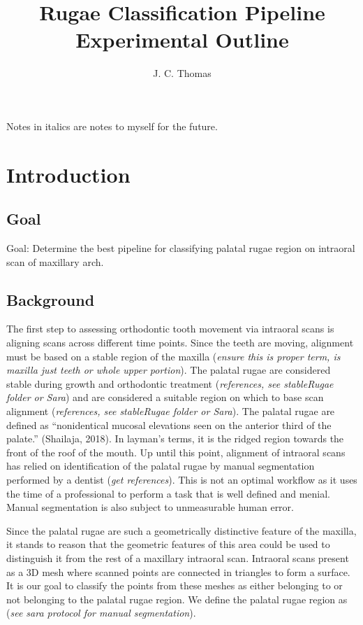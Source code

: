 \documentclass[11pt]{article}
\title{Rugae Classification Pipeline Experimental Outline}
\author{J. C. Thomas}
\theoremstyle{definition}
\begin{document}
\maketitle

Notes in italics are notes to myself for the future.

\section{Introduction}

\subsection{Goal}

Goal: Determine the best pipeline for classifying palatal rugae region on intraoral scan of maxillary arch.

\subsection{Background}

The first step to assessing orthodontic tooth movement via intraoral scans is aligning scans across different time points. Since the teeth are moving, alignment must be based on a stable region of the maxilla (\textit{ensure this is proper term, is maxilla just teeth or whole upper portion}). The palatal rugae are considered stable during growth and orthodontic treatment (\textit{references, see stableRugae folder or Sara}) and are considered a suitable region on which to base scan alignment (\textit{references, see stableRugae folder or Sara}). The palatal rugae are defined as “nonidentical mucosal elevations seen on the anterior third of the palate.” (Shailaja, 2018). In layman’s terms, it is the ridged region towards the front of the roof of the mouth. Up until this point, alignment of intraoral scans has relied on identification of the palatal rugae by manual segmentation performed by a dentist (\textit{get references}). This is not an optimal workflow as it uses the time of a professional to perform a task that is well defined and menial. Manual segmentation is also subject to unmeasurable human error. 

Since the palatal rugae are such a geometrically distinctive feature of the maxilla, it stands to reason that the geometric features of this area could be used to distinguish it from the rest of a maxillary intraoral scan. Intraoral scans present as a 3D mesh where scanned points are connected in triangles to form a surface. It is our goal to classify the points from these meshes as either belonging to or not belonging to the palatal rugae region. We define the palatal rugae region as (\textit{see sara protocol for manual segmentation}).
\end{document}
